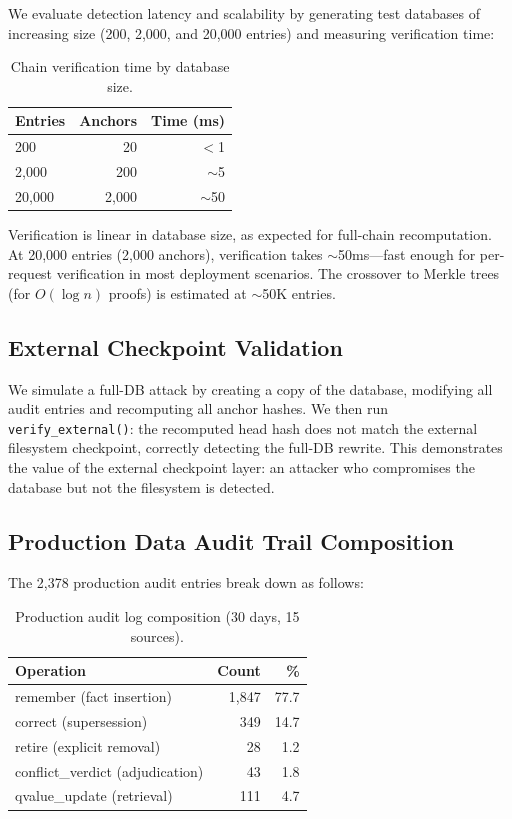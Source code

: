 \documentclass[sigconf,nonacm]{acmart}
\begin{document}
We evaluate detection latency and scalability by generating test databases of increasing size (200, 2,000, and 20,000 entries) and measuring verification time:

\begin{table}[h]
\centering
\caption{Chain verification time by database size.}
\begin{tabular}{lrr}
\toprule
Entries & Anchors & Time (ms) \\
\midrule
200 & 20 & $<$1 \\
2{,}000 & 200 & $\sim$5 \\
20{,}000 & 2{,}000 & $\sim$50 \\
\bottomrule
\end{tabular}
\end{table}

Verification is linear in database size, as expected for full-chain recomputation. At 20,000 entries (2,000 anchors), verification takes $\sim$50ms---fast enough for per-request verification in most deployment scenarios. The crossover to Merkle trees (for $O(\log n)$ proofs) is estimated at $\sim$50K entries.

\subsection{External Checkpoint Validation}

We simulate a full-DB attack by creating a copy of the database, modifying all audit entries and recomputing all anchor hashes. We then run \texttt{verify\_external()}: the recomputed head hash does not match the external filesystem checkpoint, correctly detecting the full-DB rewrite. This demonstrates the value of the external checkpoint layer: an attacker who compromises the database but not the filesystem is detected.

\subsection{Production Data Audit Trail Composition}

The 2,378 production audit entries break down as follows:

\begin{table}[h]
\centering
\caption{Production audit log composition (30 days, 15 sources).}
\begin{tabular}{lrr}
\toprule
Operation & Count & \% \\
\midrule
remember (fact insertion) & 1,847 & 77.7 \\
correct (supersession) & 349 & 14.7 \\
retire (explicit removal) & 28 & 1.2 \\
conflict\_verdict (adjudication) & 43 & 1.8 \\
qvalue\_update (retrieval) & 111 & 4.7 \\
\bottomrule
\end{tabular}
\end{table}
\end{document}
